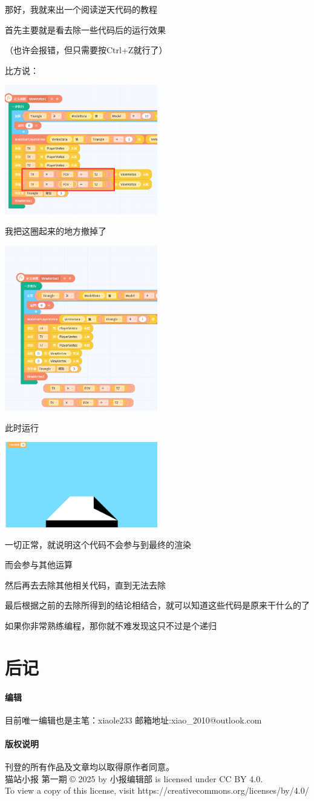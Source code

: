 \documentclass[UTF8,fontset=fandol]{article}
\begin{document}
那好，我就来出一个阅读逆天代码的教程

首先主要就是看去除一些代码后的运行效果

（也许会报错，但只需要按Ctrl+Z就行了）

比方说：

\includegraphics[width=0.5\textwidth]{assets/01/fire-1.png}

我把这圈起来的地方撤掉了

\includegraphics[width=0.5\textwidth]{assets/01/fire-2.png}

此时运行

\includegraphics[width=0.5\textwidth]{assets/01/fire-3.png}

一切正常，就说明这个代码不会参与到最终的渲染

而会参与其他运算

然后再去去除其他相关代码，直到无法去除

最后根据之前的去除所得到的结论相结合，就可以知道这些代码是原来干什么的了

如果你非常熟练编程，那你就不难发现这只不过是个递归

\section{后记}
\paragraph{编辑} 目前唯一编辑也是主笔：xiaole233 邮箱地址:xiao\_2010@outlook.com
\paragraph{版权说明} 刊登的所有作品及文章均以取得原作者同意。\\ 
猫站小报 第一期  © 2025 by 小报编辑部 is licensed under CC BY 4.0.\\ To view a copy of this license, visit https://creativecommons.org/licenses/by/4.0/
\end{document}
